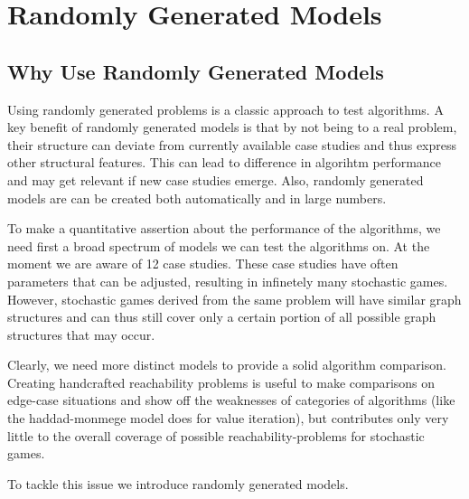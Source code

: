 \chapter{Randomly Generated Models} \label{ch:randomGen}
\section{Why Use Randomly Generated Models}
Using randomly generated problems is a classic approach to test algorithms.
A key benefit of randomly generated models is that by not being to a real problem, their structure can deviate from currently available case studies 
and thus express other structural features. 
This can lead to difference in algorihtm performance and may get relevant if new case studies emerge.
Also, randomly generated models are can be created both automatically and in large numbers.

To make a quantitative assertion about the performance of the algorithms, we need first a broad spectrum of models we can test the algorithms on.
At the moment we are aware of 12 case studies.
These case studies have often parameters that can be adjusted, resulting in infinetely many stochastic games.
However, stochastic games derived from the same problem will have similar graph structures and can thus still cover only a certain portion
of all possible graph structures that may occur.

Clearly, we need more distinct models to provide a solid algorithm comparison.
Creating handcrafted reachability problems is useful to make comparisons on edge-case situations and 
show off the weaknesses of categories of algorithms (like the haddad-monmege model does for value iteration), 
but contributes only very little to the overall coverage of possible reachability-problems for stochastic games.

To tackle this issue we introduce randomly generated models.


